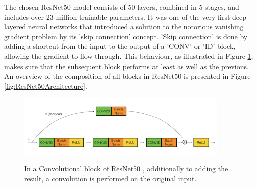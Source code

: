 The chosen ResNet50 model \citep{He:2015:DeepResidualLearningForImageRecognition} consists of 50 layers, combined in 5 stages, and includes over 23 million trainable parameters. It was one of the very first deep-layered neural networks that introduced a solution to the notorious vanishing gradient problem by its 'skip connection' concept.
\newline\newline
'Skip connection' is done by adding a shortcut from the input to the output of a 'CONV' or 'ID' block, allowing the gradient to flow through. This behaviour, as illustrated in Figure \ref{fig:ResNet50ConvBlock}, makes sure that the subsequent block performs at least as well as the previous. An overview of the composition of all blocks in ResNet50 is presented in Figure \ref{fig:ResNet50Architecture}. 

\begin{figure}[H]
  \begin{center}
  \includegraphics[angle=0, width=0.9\textwidth]{Figures/ResNet50_ConvBlock.png}
  \citep{Dwivedi:2019:ResNetInKeras}
  \caption[ResNet50 skip connection]{In a Convolutional block of ResNet50 \citep{He:2015:DeepResidualLearningForImageRecognition}, additionally to adding the result, a convolution is performed on the original input.}
  \label{fig:ResNet50ConvBlock}
  \end{center}
\end{figure}



